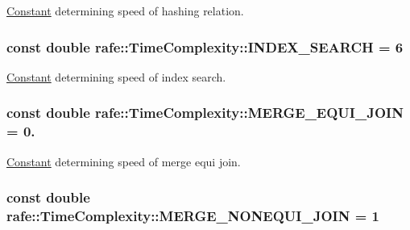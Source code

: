 \hyperlink{classrafe_1_1_constant}{Constant} determining speed of hashing relation. \hypertarget{classrafe_1_1_time_complexity_aa0e26e3055e00e90b601428b0ad74e7e}{
\subsubsection[{I\+N\+D\+E\+X\+\_\+\+S\+E\+A\+R\+C\+H}]{\setlength{\rightskip}{0pt plus 5cm}const double rafe\+::\+Time\+Complexity\+::\+I\+N\+D\+E\+X\+\_\+\+S\+E\+A\+R\+C\+H = 6\hspace{0.3cm}{\ttfamily [static]}}}\label{classrafe_1_1_time_complexity_aa0e26e3055e00e90b601428b0ad74e7e}
\hyperlink{classrafe_1_1_constant}{Constant} determining speed of index search. \hypertarget{classrafe_1_1_time_complexity_a68dde40140a8dfc63a2b74308c6884cd}{
\subsubsection[{M\+E\+R\+G\+E\+\_\+\+E\+Q\+U\+I\+\_\+\+J\+O\+I\+N}]{\setlength{\rightskip}{0pt plus 5cm}const double rafe\+::\+Time\+Complexity\+::\+M\+E\+R\+G\+E\+\_\+\+E\+Q\+U\+I\+\_\+\+J\+O\+I\+N = 0.\hspace{0.3cm}{\ttfamily [static]}}}\label{classrafe_1_1_time_complexity_a68dde40140a8dfc63a2b74308c6884cd}
\hyperlink{classrafe_1_1_constant}{Constant} determining speed of merge equi join. \hypertarget{classrafe_1_1_time_complexity_aed73c88d72629bb341ed639edf5e255b}{
\subsubsection[{M\+E\+R\+G\+E\+\_\+\+N\+O\+N\+E\+Q\+U\+I\+\_\+\+J\+O\+I\+N}]{\setlength{\rightskip}{0pt plus 5cm}const double rafe\+::\+Time\+Complexity\+::\+M\+E\+R\+G\+E\+\_\+\+N\+O\+N\+E\+Q\+U\+I\+\_\+\+J\+O\+I\+N = 1\hspace{0.3cm}{\ttfamily [static]}}}\label{classrafe_1_1_time_complexity_aed73c88d72629bb341ed639edf5e255b}
